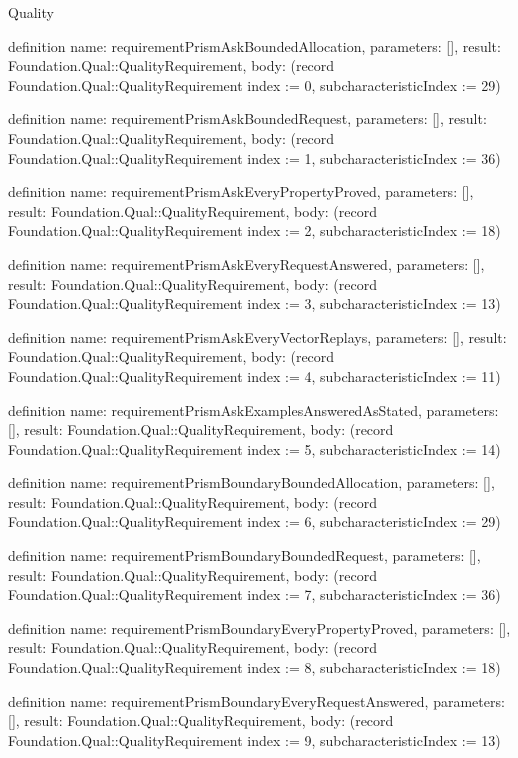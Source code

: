 \begin{lexlean}{Quality}
\begin{semanticmodule}
definition{
  name: requirementPrismAskBoundedAllocation,
  parameters: [],
  result: Foundation.Qual::QualityRequirement,
  body: (record Foundation.Qual::QualityRequirement {index := 0, subcharacteristicIndex := 29})
}

definition{
  name: requirementPrismAskBoundedRequest,
  parameters: [],
  result: Foundation.Qual::QualityRequirement,
  body: (record Foundation.Qual::QualityRequirement {index := 1, subcharacteristicIndex := 36})
}

definition{
  name: requirementPrismAskEveryPropertyProved,
  parameters: [],
  result: Foundation.Qual::QualityRequirement,
  body: (record Foundation.Qual::QualityRequirement {index := 2, subcharacteristicIndex := 18})
}

definition{
  name: requirementPrismAskEveryRequestAnswered,
  parameters: [],
  result: Foundation.Qual::QualityRequirement,
  body: (record Foundation.Qual::QualityRequirement {index := 3, subcharacteristicIndex := 13})
}

definition{
  name: requirementPrismAskEveryVectorReplays,
  parameters: [],
  result: Foundation.Qual::QualityRequirement,
  body: (record Foundation.Qual::QualityRequirement {index := 4, subcharacteristicIndex := 11})
}

definition{
  name: requirementPrismAskExamplesAnsweredAsStated,
  parameters: [],
  result: Foundation.Qual::QualityRequirement,
  body: (record Foundation.Qual::QualityRequirement {index := 5, subcharacteristicIndex := 14})
}

definition{
  name: requirementPrismBoundaryBoundedAllocation,
  parameters: [],
  result: Foundation.Qual::QualityRequirement,
  body: (record Foundation.Qual::QualityRequirement {index := 6, subcharacteristicIndex := 29})
}

definition{
  name: requirementPrismBoundaryBoundedRequest,
  parameters: [],
  result: Foundation.Qual::QualityRequirement,
  body: (record Foundation.Qual::QualityRequirement {index := 7, subcharacteristicIndex := 36})
}

definition{
  name: requirementPrismBoundaryEveryPropertyProved,
  parameters: [],
  result: Foundation.Qual::QualityRequirement,
  body: (record Foundation.Qual::QualityRequirement {index := 8, subcharacteristicIndex := 18})
}

definition{
  name: requirementPrismBoundaryEveryRequestAnswered,
  parameters: [],
  result: Foundation.Qual::QualityRequirement,
  body: (record Foundation.Qual::QualityRequirement {index := 9, subcharacteristicIndex := 13})
}


\end{semanticmodule}
\end{lexlean}
